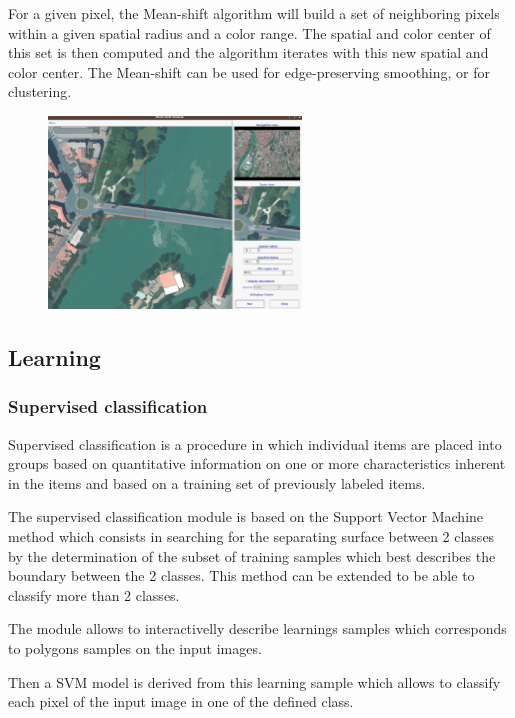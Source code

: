 For a given pixel, the Mean-shift algorithm will build a set of
neighboring pixels within a given spatial radius and a color
range. The spatial and color center of this set is then computed and
the algorithm iterates with this new spatial and color center. The
Mean-shift can be used for edge-preserving smoothing, or for
clustering.

\begin{figure}
  \center
  \includegraphics[width=0.6\textwidth]{../Art/MonteverdiImages/monteverdi_mean_shift.png}
  \label{fig:meanshift}
\end{figure}

\subsection{Learning}
\subsubsection{Supervised classification}
Supervised classification is a procedure in which individual items are
placed into groups based on quantitative information on one or more
characteristics inherent in the items and based on a training set of
previously labeled items.

The supervised classification module is based on the Support Vector
Machine method which consists in searching for the separating surface
between 2 classes by the determination of the subset of training
samples which best describes the boundary between the 2 classes. This
method can be extended to be able to classify more than 2 classes.

The module allows to interactivelly describe learnings samples which
corresponds to polygons samples on the input images.

Then a SVM model is derived from this learning sample which allows to
classify each pixel of the input image in one of the defined class.


